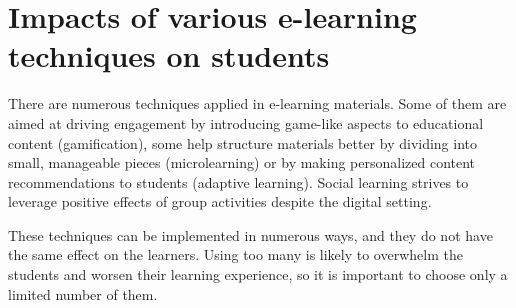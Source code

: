 







\section{Impacts of various e-learning techniques on students}

There are numerous techniques applied in e-learning materials. Some of them are aimed at driving engagement by introducing game-like aspects to educational content (gamification), some help structure materials better by dividing into small, manageable pieces (microlearning) or by making personalized content recommendations to students (adaptive learning). Social learning strives to leverage positive effects of group activities despite the digital setting.

These techniques can be implemented in numerous ways, and they do not have the same effect on the learners. Using too many is likely to overwhelm the students and worsen their learning experience, so it is important to choose only a limited number of them. 

